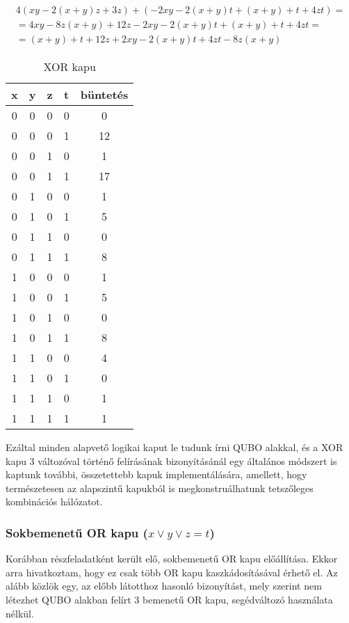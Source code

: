 \begin{align}
	4(xy-2(x+y)z+3z)+(-2xy-2(x+y)t+(x+y)+t+4zt) = \\
    = 4xy-8z(x+y)+12z-2xy-2(x+y)t+(x+y)+t+4zt = \\
	= (x+y)+t+12z+2xy-2(x+y)t+4zt-8z(x+y)
\end{align}

\begin{table}[ht]
	\footnotesize
	\centering
	\begin{tabular}{ c c c c c }
		\toprule
		x & y & z & t & büntetés \\
		\midrule
		0 & 0 & 0 & 0 & 0 \\
		0 & 0 & 0 & 1 & 12 \\
		0 & 0 & 1 & 0 & 1 \\
		0 & 0 & 1 & 1 & 17 \\
		0 & 1 & 0 & 0 & 1 \\
		0 & 1 & 0 & 1 & 5 \\
		0 & 1 & 1 & 0 & 0 \\
		0 & 1 & 1 & 1 & 8 \\		
		1 & 0 & 0 & 0 & 1 \\
		1 & 0 & 0 & 1 & 5 \\
		1 & 0 & 1 & 0 & 0 \\
		1 & 0 & 1 & 1 & 8 \\
		1 & 1 & 0 & 0 & 4 \\
		1 & 1 & 0 & 1 & 0 \\
		1 & 1 & 1 & 0 & 1 \\
		1 & 1 & 1 & 1 & 1 \\		
		\bottomrule
	\end{tabular}
	\caption{XOR kapu}
	\label{tab:XORgate}
\end{table}

Ezáltal minden alapvető logikai kaput le tudunk írni QUBO alakkal, és a XOR kapu 3 változóval történő felírásának bizonyításánál egy általános módszert is kaptunk további, összetettebb kapuk implementálására, amellett, hogy természetesen az alapszintű kapukból is megkonstruálhatunk tetszőleges kombinációs hálózatot.

\subsubsection{Sokbemenetű OR kapu ($x \vee y \vee z = t$)}

Korábban részfeladatként került elő, sokbemenetű OR kapu előállítása. Ekkor arra hivatkoztam, hogy ez csak több OR kapu kaszkádosításával érhető el. Az alább közlök egy, az előbb látotthoz hasonló bizonyítást, mely szerint nem létezhet QUBO alakban felírt 3 bemenetű OR kapu, segédváltozó használata nélkül.

